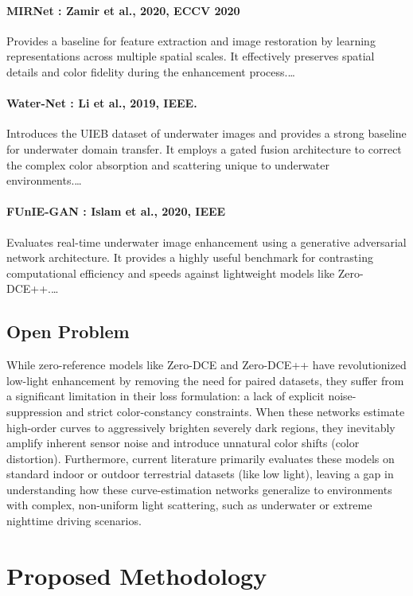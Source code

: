 \documentclass[11pt, letterpaper]{article}
\begin{document}
\paragraph{MIRNet : Zamir et al., 2020, ECCV 2020}
Provides a baseline for feature extraction and image restoration by learning representations across multiple spatial scales. It effectively preserves spatial details and color fidelity during the enhancement process.\ldots

\paragraph{Water-Net : Li et al., 2019, IEEE.}
Introduces the UIEB dataset of underwater images and provides a strong baseline for underwater domain transfer. It employs a gated fusion architecture to correct the complex color absorption and scattering unique to underwater environments.\ldots

\paragraph{FUnIE-GAN : Islam et al., 2020, IEEE}
Evaluates real-time underwater image enhancement using a generative adversarial network architecture. It provides a highly useful benchmark for contrasting computational efficiency and speeds against lightweight models like Zero-DCE++.\ldots

\subsection{Open Problem}

While zero-reference models like Zero-DCE and Zero-DCE++ have revolutionized low-light enhancement by removing the need for paired datasets, they suffer from a significant limitation in their loss formulation: a lack of explicit noise-suppression and strict color-constancy constraints. When these networks estimate high-order curves to aggressively brighten severely dark regions, they inevitably amplify inherent sensor noise and introduce unnatural color shifts (color distortion). Furthermore, current literature primarily evaluates these models on standard indoor or outdoor terrestrial datasets (like low light), leaving a gap in understanding how these curve-estimation networks generalize to environments with complex, non-uniform light scattering, such as underwater or extreme nighttime driving scenarios.

\section{Proposed Methodology}
\end{document}
